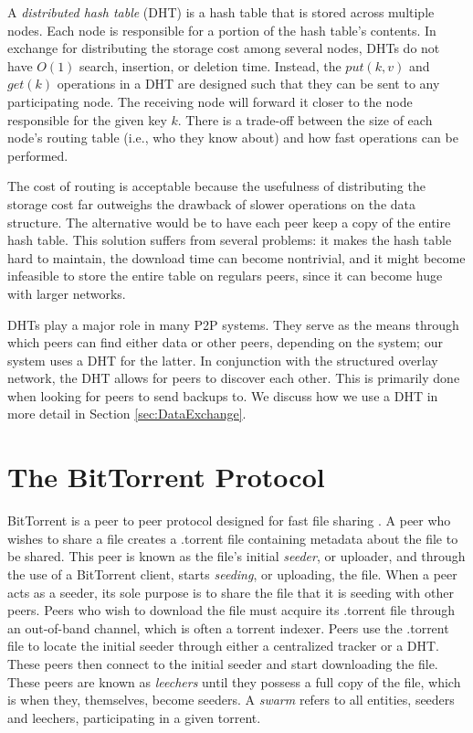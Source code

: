 \documentclass[12pt]{report}
\begin{document}
A \textit{distributed hash table} (DHT) is a hash table that is stored across multiple nodes. Each node is responsible for a portion of the hash table's contents. In exchange for distributing the storage cost among several nodes, DHTs do not have $O(1)$ search, insertion, or deletion time. Instead, the $put(k, v)$ and $get(k)$ operations in a DHT are designed such that they can be sent to any participating node. The receiving node will forward it closer to the node responsible for the given key $k$. There is a trade-off between the size of each node's routing table (i.e., who they know about) and how fast operations can be performed.

The cost of routing is acceptable because the usefulness of distributing the storage cost far outweighs the drawback of slower operations on the data structure. The alternative would be to have each peer keep a copy of the entire hash table. This solution suffers from several problems: it makes the hash table hard to maintain, the download time can become nontrivial, and it might become infeasible to store the entire table on regulars peers, since it can become huge with larger networks.


DHTs play a major role in many P2P systems. They serve as the means through which peers can find either data or other peers, depending on the system; our system uses a DHT for the latter. In conjunction with the structured overlay network, the DHT allows for peers to discover each other. This is primarily done when looking for peers to send backups to. We discuss how we use a DHT in more detail in Section \ref{sec:DataExchange}.

\section{The BitTorrent Protocol} \label{sec:TheBitTorrentProtocol}
BitTorrent is a peer to peer protocol designed for fast file sharing \cite{bittorrentProtocol}. A peer who wishes to share a file creates a .torrent file containing metadata about the file to be shared. This peer is known as the file's initial \textit{seeder}, or uploader, and through the use of a BitTorrent client, starts \textit{seeding}, or uploading, the file. When a peer acts as a seeder, its sole purpose is to share the file that it is seeding with other peers. Peers who wish to download the file must acquire its .torrent file through an out-of-band channel, which is often a torrent indexer. Peers use the .torrent file to locate the initial seeder through either a centralized tracker or a DHT. These peers then connect to the initial seeder and start downloading the file. These peers are known as \textit{leechers} until they possess a full copy of the file, which is when they, themselves, become seeders. A \textit{swarm} refers to all entities, seeders and leechers, participating in a given torrent.
\end{document}
